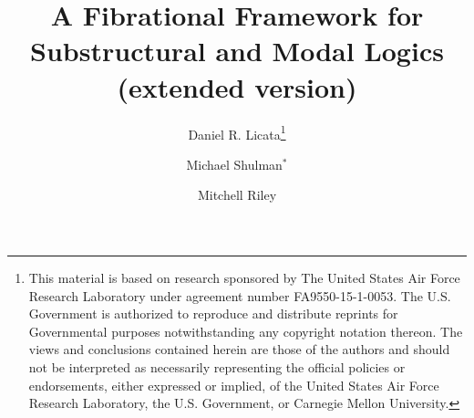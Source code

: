 \documentclass{article}
\begin{document}
\title{A Fibrational Framework for \\ Substructural and Modal Logics \\ (extended version)}



\author[1]{{Daniel R. Licata}\thanks{This material is based on research sponsored by The United States Air Force Research Laboratory under agreement number FA9550-15-1-0053.  The U.S. Government is authorized to reproduce and distribute reprints for Governmental purposes notwithstanding any copyright notation thereon.  The views and conclusions contained herein are those of the authors and should not be interpreted as necessarily representing the official policies or endorsements, either expressed or implied, of the United States Air Force Research Laboratory, the U.S. Government, or Carnegie Mellon University.}}
\author[2]{{Michael Shulman}$^*$}
\author[1]{{Mitchell Riley}}

\maketitle
\end{document}

